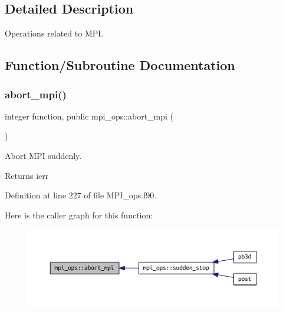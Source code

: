 \subsection{Detailed Description}
Operations related to M\+PI. 

\subsection{Function/\+Subroutine Documentation}
\mbox{\label{namespacempi__ops_a54d9258ef985728345579e8e57dc8dfe}} 
\subsubsection{\texorpdfstring{abort\+\_\+mpi()}{abort\_mpi()}}
{\footnotesize\ttfamily integer function, public mpi\+\_\+ops\+::abort\+\_\+mpi (\begin{DoxyParamCaption}{ }\end{DoxyParamCaption})}



Abort M\+PI suddenly. 

\begin{DoxyReturn}{Returns}
ierr 
\end{DoxyReturn}


Definition at line 227 of file M\+P\+I\+\_\+ops.\+f90.

Here is the caller graph for this function\+:\nopagebreak
\begin{figure}[H]
\begin{center}
\leavevmode
\includegraphics[width=350pt]{namespacempi__ops_a54d9258ef985728345579e8e57dc8dfe_icgraph}
\end{center}
\end{figure}
\mbox{\label{namespacempi__ops_a932eba1c998dd7a0f1191b55cd754be3}} 
